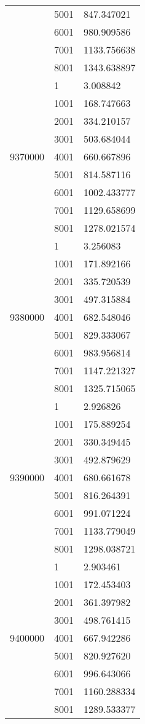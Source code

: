 \begin{table}[htb!]
\begin{tabular}{lll}
 & 5001 & 847.347021 \\
 & 6001 & 980.909586 \\
 & 7001 & 1133.756638 \\
 & 8001 & 1343.638897 \\
\multirow[c]{9}{*}{9370000} & 1 & 3.008842 \\
 & 1001 & 168.747663 \\
 & 2001 & 334.210157 \\
 & 3001 & 503.684044 \\
 & 4001 & 660.667896 \\
 & 5001 & 814.587116 \\
 & 6001 & 1002.433777 \\
 & 7001 & 1129.658699 \\
 & 8001 & 1278.021574 \\
\multirow[c]{9}{*}{9380000} & 1 & 3.256083 \\
 & 1001 & 171.892166 \\
 & 2001 & 335.720539 \\
 & 3001 & 497.315884 \\
 & 4001 & 682.548046 \\
 & 5001 & 829.333067 \\
 & 6001 & 983.956814 \\
 & 7001 & 1147.221327 \\
 & 8001 & 1325.715065 \\
\multirow[c]{9}{*}{9390000} & 1 & 2.926826 \\
 & 1001 & 175.889254 \\
 & 2001 & 330.349445 \\
 & 3001 & 492.879629 \\
 & 4001 & 680.661678 \\
 & 5001 & 816.264391 \\
 & 6001 & 991.071224 \\
 & 7001 & 1133.779049 \\
 & 8001 & 1298.038721 \\
\multirow[c]{9}{*}{9400000} & 1 & 2.903461 \\
 & 1001 & 172.453403 \\
 & 2001 & 361.397982 \\
 & 3001 & 498.761415 \\
 & 4001 & 667.942286 \\
 & 5001 & 820.927620 \\
 & 6001 & 996.643066 \\
 & 7001 & 1160.288334 \\
 & 8001 & 1289.533377 \\

\end{tabular}
\end{table}
